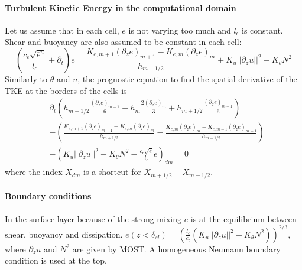 \paragraph{Turbulent Kinetic Energy in the computational domain}
Let us assume that in each cell, $e$ is not varying too much and
$l_\epsilon$ is constant.
Shear and buoyancy are also assumed to be constant in each cell:
\begin{equation}
\label{eq:ND_StratifiedCase_SemiDiscreteTKE}
    \left(
    \frac{c_\epsilon \sqrt{\overline{e}^n}}{l_\epsilon}
    + \partial_t
    \right) \overline{e}
    =\frac{K_{e,m+1} (\partial_z e)_{m+1} -
    K_{e,m} (\partial_z e)_{m}}{h_{m+1/2}}
    + K_u ||\partial_z u||^2
    - K_\theta N^2
\end{equation}
Similarly to $\theta$ and $u$, the prognostic equation
to find the spatial derivative of the TKE at 
the borders of the cells is
\begin{equation}
\label{eq:ND_StratifiedCase_prognosticTKE_FV}
\begin{aligned}
&\partial_t
\left(
    h_{m-1/2}\frac{(\partial_z e)_{m-1}}{6}+
    h_m\frac{2(\partial_z e)_{m}}{3}+
    h_{m+1/2}\frac{(\partial_z e)_{m+1}}{6}
\right)
\\&-
    \left(\frac{K_{e,m+1} (\partial_z e)_{m+1} -
        K_{e,m} (\partial_z e)_{m}}{h_{m+1/2}}
-
    \frac{K_{e,m} (\partial_z e)_{m} -
        K_{e,m-1} (\partial_z e)_{m-1}}{h_{m-1/2}}
        \right)
\\
&- \left(K_{u} ||\partial_z u||^2
-  K_\theta N^2 
- \frac{c_\epsilon \sqrt{\overline{e}}}{l_\epsilon} \overline{e}
\right)_{dm} = 0
\end{aligned}
\end{equation}
where the index $X_{dm}$ is a shortcut for $X_{m+1/2} - X_{m-1/2}$.

\paragraph{Boundary conditions}
In the surface layer because of the strong mixing $e$
is at the equilibrium between shear, buoyancy and dissipation.
$e(z<\delta_{sl}) = \left(\frac{l_\epsilon}{c_\epsilon}
(K_u||\partial_z u||^2 - K_\theta N^2)\right)^{2/3}$, where
$\partial_z u$ and $N^2$ are given by MOST.
A homogeneous Neumann boundary condition is used at the top.

